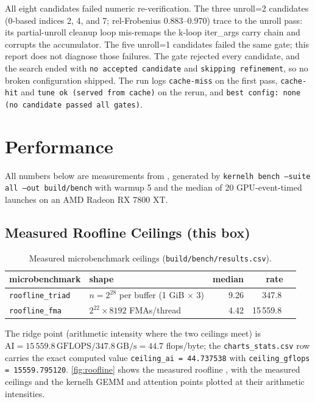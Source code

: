 \documentclass[10pt,twoside]{article}
\newcommand{\ms}{\text{ms}}
\newcommand{\gflops}{\,\text{GFLOPS}}
\newcommand{\gbs}{\,\text{GB/s}}
\begin{document}
All eight candidates failed numeric re-verification. The three unroll=2 candidates
(0-based indices 2, 4, and 7; rel-Frobenius 0.883--0.970) trace to the unroll pass: its
partial-unroll cleanup loop mis-remaps the k-loop iter\_args carry chain and corrupts the
accumulator. The five unroll=1 candidates failed the same gate; this report does not diagnose
those failures. The gate rejected every candidate, and the search ended with \texttt{no
accepted candidate} and \texttt{skipping refinement}, so no broken configuration shipped. The run logs
\texttt{cache-miss} on the first pass, \texttt{cache-hit} and \texttt{tune ok (served from
cache)} on the rerun, and \texttt{best config: none (no candidate passed all gates)}.

\section{Performance}
\label{sec:perf}

All numbers below are measurements from , generated by
\texttt{kernelh bench --suite all --out build/bench} with warmup 5 and the median of 20
GPU-event-timed launches on an AMD Radeon RX 7800 XT.

\subsection{Measured Roofline Ceilings (this box)}
\label{sec:roofline}

\begin{table}[H]
\centering
\caption{Measured microbenchmark ceilings (\texttt{build/bench/results.csv}).}
\label{tab:roofline}
\begin{tabular}{@{}llrrc@{}}
\toprule
microbenchmark & shape & median \ms & rate \\
\midrule
\texttt{roofline\_triad} & $n=2^{28}$ per buffer (1 GiB $\times$ 3) & 9.26 & 347.8\gbs \\
\texttt{roofline\_fma} & $2^{22} \times 8192$ FMAs/thread & 4.42 & 15\,559.8\gflops \\
\bottomrule
\end{tabular}
\end{table}

The ridge point (arithmetic intensity where the two ceilings meet) is
$\mathrm{AI} = 15\,559.8\gflops / 347.8\gbs = 44.7$ flops/byte; the
\texttt{charts\_stats.csv} row carries the exact computed value \texttt{ceiling\_ai =
44.737538} with \texttt{ceiling\_gflops = 15559.795120}. \cref{fig:roofline} shows the
measured roofline \cite{roofline2009}, with the measured ceilings and the kernelh GEMM and
attention points plotted at their arithmetic intensities.
\end{document}
